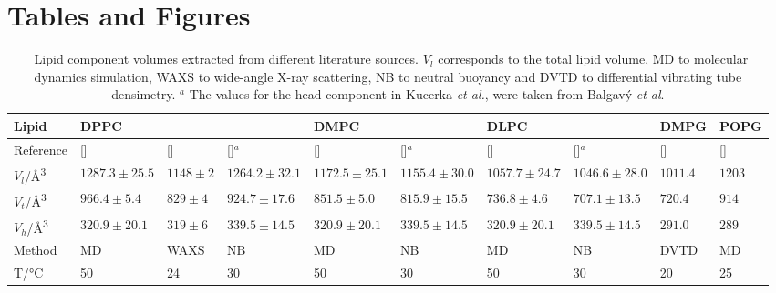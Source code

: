 \documentclass[11pt,a4paper]{paper}
\begin{document}
\section{Tables and Figures}

\begin{table}
  \centering
	\caption{\ Lipid component volumes extracted from different literature sources. $V_l$ corresponds to the total lipid volume, MD to molecular dynamics simulation, WAXS to wide-angle X-ray scattering, NB to neutral buoyancy and DVTD to differential vibrating tube densimetry. $^a$ The values for the head component in Kucerka \emph{et al.},\cite{Kucerka2004} were taken from Balgav\'{y} \emph{et al}.\cite{Balgavy2001}}
  \centering
	\label{tab:water}
	\begin{tabular}{l|lll|ll|ll|l|l}
    Lipid & DPPC & & & DMPC & & DLPC & & DMPG & POPG \\
    \hline
    Reference & [\cite{Armen1998}] & [\cite{Sun1994}] & [\cite{Kucerka2004,Balgavy2001}]$^a$ & [\cite{Armen1998}] & [\cite{Kucerka2004,Balgavy2001}]$^a$ & [\cite{Armen1998}] & [\cite{Kucerka2004,Balgavy2001}]$^a$ & [\cite{Pan2012}] & [\cite{Kucerka2012}] \\
    \hline
    $V_l$/\si{\angstrom^3} & $1287.3\pm25.5$ & $1148\pm2$ & $1264.2\pm32.1$ & $1172.5\pm25.1$ & $1155.4\pm30.0$ & $1057.7\pm24.7$ & $1046.6\pm28.0$ & $1011.4$ & $1203$ \\
    $V_t$/\si{\angstrom^3} & $966.4\pm5.4$ & $829\pm4$ & $924.7\pm17.6$ & $851.5\pm5.0$ & $815.9\pm15.5$ & $736.8\pm4.6$ & $707.1\pm13.5$ & $720.4$ & $914$ \\
    $V_h$/\si{\angstrom^3} & $320.9\pm20.1$ & $319\pm6$ & $339.5\pm14.5$ & $320.9\pm20.1$ & $339.5\pm14.5$ & $320.9\pm20.1$ & $339.5\pm14.5$ & $291.0$ & $289$ \\
    Method & MD & WAXS & NB & MD & NB & MD & NB & DVTD & MD \\
    T/\si{\celsius} & 50 & 24 & 30 & 50 & 30 & 50 & 30 & 20 & 25 \\
	\end{tabular}
\end{table}
\end{document}
